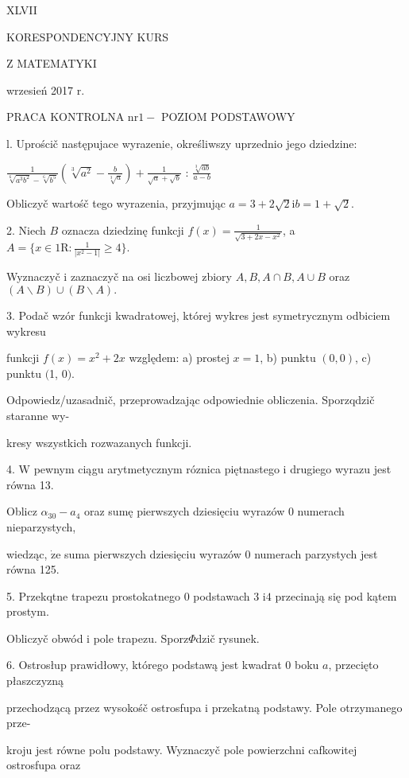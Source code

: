 \documentclass[a4paper,12pt]{article}
\begin{document}
XLVII

KORESPONDENCYJNY KURS

Z MATEMATYKI

wrzesień 2017 r.

PRACA KONTROLNA $\mathrm{n}\mathrm{r} 1 -$ POZIOM PODSTAWOWY

l. Uprościč następujace wyrazenie, określiwszy uprzednio jego dziedzine:

$\displaystyle \frac{1}{\sqrt[6]{a^{3}b^{2}}-\sqrt[6]{b^{5}}}(\sqrt[3]{a^{2}}-\frac{b}{\sqrt[3]{a}})+\frac{1}{\sqrt{a}+\sqrt{b}}$ : $\displaystyle \frac{\sqrt[3]{ab}}{a-b}$

Obliczyč wartośč tego wyrazenia, przyjmując $a=3+2\sqrt{2} \mathrm{i} b=1+\sqrt{2}.$

2. Niech $B$ oznacza dziedzinę funkcji $f(x)=\displaystyle \frac{1}{\sqrt{3+2x-x^{2}}}$, a $A=\displaystyle \{x\in 1\mathrm{R}:\frac{1}{|x^{2}-1|}\geq 4\}.$

Wyznaczyč $\mathrm{i}$ zaznaczyč na osi liczbowej zbiory $A, B, A\cap B, A\cup B$ oraz $(A\backslash B)\cup(B\backslash A).$

3. Podač wzór funkcji kwadratowej, której wykres jest symetrycznym odbiciem wykresu

funkcji $f(x)=x^{2}+2x$ względem: a) prostej $x=1$, b) punktu $(0,0)$, c) punktu $($1, $0).$

Odpowiedz/uzasadnič, przeprowadzając odpowiednie obliczenia. Sporzqdzič staranne wy-

kresy wszystkich rozwazanych funkcji.

4. $\mathrm{W}$ pewnym ciągu arytmetycznym róznica piętnastego $\mathrm{i}$ drugiego wyrazu jest równa 13.

Oblicz $\alpha_{30}-a_{4}$ oraz sumę pierwszych dziesięciu wyrazów $0$ numerach nieparzystych,

wiedząc, $\dot{\mathrm{z}}\mathrm{e}$ suma pierwszych dziesięciu wyrazów $0$ numerach parzystych jest równa 125.

5. Przekqtne trapezu prostokatnego $0$ podstawach 3 $\mathrm{i}4$ przecinają się pod kątem prostym.

Obliczyč obwód $\mathrm{i}$ pole trapezu. Sporz$\Phi$dzič rysunek.

6. Ostrosłup prawidłowy, którego podstawą jest kwadrat $0$ boku $a$, przecięto płaszczyzną

przechodzącą przez wysokośč ostrosfupa $\mathrm{i}$ przekatną podstawy. Pole otrzymanego prze-

kroju jest równe polu podstawy. Wyznaczyč pole powierzchni cafkowitej ostrosfupa oraz
\end{document}
